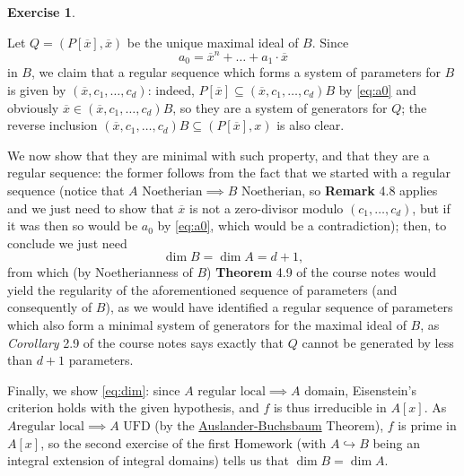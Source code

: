 \documentclass[a4paper]{article}
\theoremstyle{definition}
\theoremstyle{definition}
\theoremstyle{remark}
\theoremstyle{definition}
\newtheorem{exercise}{Exercise}[section]
\begin{document}
\begin{exercise}
\begin{itemize}
	Let $Q=(P[\overline{x}],\overline{x})$ be the unique maximal ideal of $B$. Since
	\begin{equation}\label{eq:a0}
		a_0= \overline{x}^n+\dots+a_1\cdot \overline{x}
	\end{equation}
	in $B$, we claim that a regular sequence which forms a system of parameters for $B$ is given by $(\overline{x},c_1,\dots,c_d)$: indeed, $P[\overline{x}]\subseteq(\overline{x},c_1,\dots,c_d)B$ by \eqref{eq:a0}
	and obviously $\overline{x}\in(\overline{x},c_1,\dots,c_d)B$, so they are a system of generators for $Q$; the reverse inclusion
	$(\overline{x},c_1,\dots,c_d)B\subseteq\left( P[\overline{x}],x \right) $ is also clear.

	We now show that they are minimal with such property, and that they
	are a regular sequence: the former follows from the fact that we started with a regular sequence (notice that $A \text{ Noetherian}\implies B
	\text{ Noetherian}$, so \textbf{Remark} 4.8 applies and we just need to show that $\overline{x}$ is not a zero-divisor modulo $(c_1,\dots,c_d)$, but if it was then so
	would be $a_0$ by \eqref{eq:a0}, which would be a contradiction); then, to conclude we just need
	\begin{equation}\label{eq:dim}\operatorname{dim}{B}=\operatorname{dim}{A}=d+1,\end{equation} from which (by Noetherianness of $B$) \textbf{Theorem} 4.9 of
the course notes would yield the
	regularity of the aforementioned sequence of parameters (and consequently of $B$), as we would have
	identified a regular sequence of parameters which also form a minimal system of generators for the maximal ideal of $B$, as \textit{Corollary} 2.9 of the course notes says
	exactly that $Q$ cannot be generated by less than $d+1$ parameters.

	Finally, we show \eqref{eq:dim}: since $A \text{ regular local}\implies A \text{ domain}$, Eisenstein's criterion holds with the given hypothesis, and $f$ is thus irreducible in $A[x]$. As $A \text{
	regular local}\implies A \text{ UFD}$ (by the \href{https://tinyurl.com/2p87hdny}{Auslander-Buchsbaum} Theorem), $f$ is prime in
		$A[x]$, so the second exercise of the first Homework (with $A\hookrightarrow B$ being an integral extension of integral domains) tells us that
		$\operatorname{dim}{B}=\operatorname{dim}{A}$.
	\end{itemize}
\end{exercise}
\end{document}
